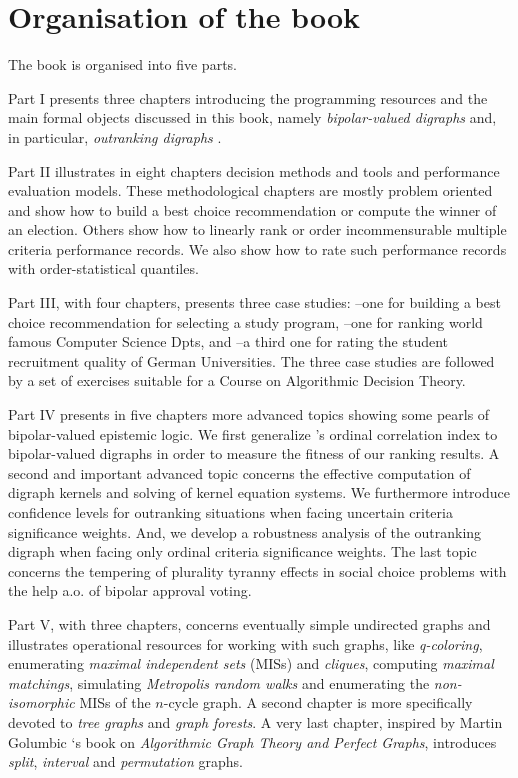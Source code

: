 \section{Organisation of the book}
\label{sec:0.2}

The book is organised into five parts.

Part I presents three chapters introducing the \Digraph programming resources and the main formal objects discussed in this book, namely \emph{bipolar-valued digraphs} and, in particular, \emph{outranking digraphs} \citep{BIS-2021}.

Part II illustrates in eight chapters decision methods and tools and performance evaluation models. These methodological chapters are mostly problem oriented and show how to build a best choice recommendation or compute the winner of an election. Others show how to linearly rank or order incommensurable multiple criteria performance records. We also show how to rate such performance records with order-statistical quantiles.

Part III, with four chapters, presents three case studies: --one for building a best choice recommendation for selecting a study program, --one for ranking world famous Computer Science Dpts, and --a third one for rating the student recruitment quality of German Universities. The three case studies are followed by a set of exercises suitable for a Course on Algorithmic Decision Theory.

Part IV presents in five chapters more advanced topics showing some pearls of bipolar-valued epistemic logic. We first generalize \Kendall 's ordinal correlation index to bipolar-valued digraphs in order to measure the fitness of our ranking results. A second and important advanced topic concerns the effective computation of digraph kernels and solving of \Berge kernel equation systems. We furthermore introduce confidence levels for outranking situations when facing uncertain criteria significance weights. And, we develop a robustness analysis of the outranking digraph when facing only ordinal criteria significance weights. The last topic concerns the tempering of plurality tyranny effects in social choice problems with the help a.o. of bipolar approval voting. 

Part V, with three chapters, concerns eventually simple undirected graphs and illustrates operational resources for working with such graphs, like \emph{q-coloring}, enumerating\emph{ maximal independent sets} (MISs) and \emph{cliques}, computing \emph{maximal matchings}, simulating \emph{Metropolis random walks} and enumerating the \emph{non-isomorphic} MISs of the $n$-cycle graph. A second chapter is more specifically devoted to \emph{tree graphs} and \emph{graph forests}. A very last chapter, inspired by Martin Golumbic ‘s book on \emph{Algorithmic Graph Theory and Perfect Graphs}, introduces \emph{split}, \emph{interval} and \emph{permutation} graphs.

